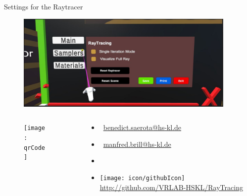 \documentclass[final,hyperref={pdfpagelabels=false}]{beamer}
\begin{document}
\begin{frame}[t]
\begin{columns}[t]
\begin{column}{0.465\textwidth}
\begin{block}{Settings for the Raytracer}
    \begin{figure}
    	\centering
        \includegraphics[width=0.95\linewidth]{settings}
    \end{figure}
\end{block}
\end{column}
\begin{column}{.025\textwidth}\end{column} %
\end{columns}

\vspace*{1.25cm}

\begin{columns}[t]

\vspace*{0.2cm}

\begin{column}{0.15\textwidth}

\begin{figure}[h]

\vspace*{1.0cm}

\centering
\texttt{[image: qrCode]}
\end{figure}
\end{column}

\begin{column}{0.025\textwidth}\end{column} %

\begin{column}{0.3\textwidth}
\vspace*{3.0cm}
\begin{itemize}
\item[] \Letter\ \href{benedict.saerota@hs-kl.de}{benedict.saerota@hs-kl.de}
\item[] \Letter\ \href{manfred.brill@hs-kl.de}{manfred.brill@hs-kl.de}
\item[]
\item[] \texttt{[image: icon/githubIcon]} \href{https://github.com/VRLAB-HSKL/RayTracing}{http://github.com/VRLAB-HSKL/RayTracing}
\end{itemize}
\end{column}


\end{columns}
\end{frame}
\end{document}
